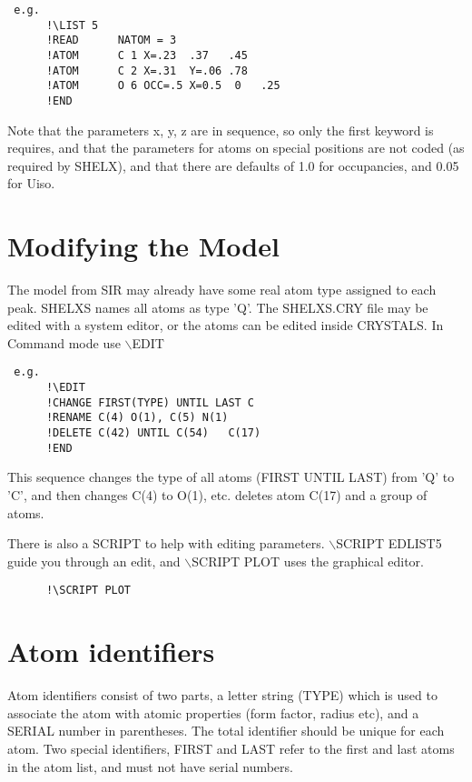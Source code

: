 \documentclass[10pt,a4paper]{report}
\begin{document}
\small\begin{verbatim} e.g.
      !\LIST 5
      !READ      NATOM = 3
      !ATOM      C 1 X=.23  .37   .45
      !ATOM      C 2 X=.31  Y=.06 .78
      !ATOM      O 6 OCC=.5 X=0.5  0   .25
      !END
\end{verbatim}\normalsize





Note that the parameters x, y, z are in sequence, so only the first keyword is
 requires, and that the parameters for atoms on special positions are not coded
 (as required by SHELX),
 and that there are defaults of 1.0 for occupancies, and 0.05 for Uiso.




\section{Modifying the Model}


The model from SIR may already have some real atom type assigned to each
 peak. SHELXS names all atoms as type 'Q'. The SHELXS.CRY file may be edited
 with a system editor, or the atoms can be edited inside CRYSTALS. In
      Command mode use $\backslash$EDIT

\small\begin{verbatim}
 e.g.
      !\EDIT
      !CHANGE FIRST(TYPE) UNTIL LAST C
      !RENAME C(4) O(1), C(5) N(1)
      !DELETE C(42) UNTIL C(54)   C(17)
      !END
\end{verbatim}\normalsize




This sequence changes the type of all atoms (FIRST UNTIL LAST) from
 'Q' to 'C', and then changes C(4) to O(1), etc. deletes atom C(17) and a group
 of atoms.


There is also a SCRIPT to help with editing parameters. $\backslash$SCRIPT EDLIST5
 guide you through an edit, and $\backslash$SCRIPT PLOT uses the graphical editor.
\small\begin{verbatim}
      !\SCRIPT PLOT
\end{verbatim}\normalsize





\section{Atom identifiers}


Atom identifiers consist of two parts, a letter string (TYPE)
 which is used
 to associate the atom with atomic properties (form factor, radius etc), and
 a SERIAL
 number in parentheses. The total identifier should be unique for each atom.
 Two special identifiers, FIRST and LAST refer to the first and last atoms in
 the atom list, and must not have serial numbers.
\end{document}
